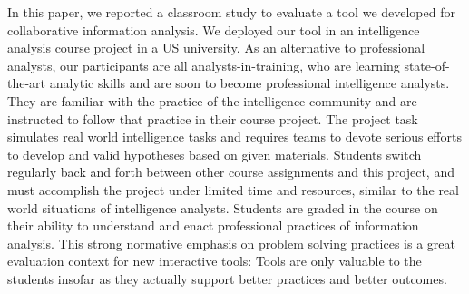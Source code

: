 
In this paper, we reported a classroom study to evaluate a tool we developed for collaborative information analysis. We deployed our tool in an intelligence analysis course project in a US university. As an alternative to professional analysts, our participants are all analysts-in-training, who are learning state-of-the-art analytic skills and are soon to become professional intelligence analysts. They are familiar with the practice of the intelligence community and are instructed to follow that practice in their course project. The project task simulates real world intelligence tasks and requires teams to devote serious efforts to develop and valid hypotheses based on given materials. Students switch regularly back and forth between other course assignments and this project, and must accomplish the project under limited time and resources, similar to the real world situations of intelligence analysts. Students are graded in the course on their ability to understand and enact professional practices of information analysis. This strong normative emphasis on problem solving practices is a great evaluation context for new interactive tools: Tools are only valuable to the students insofar as they actually support better practices and better outcomes.

